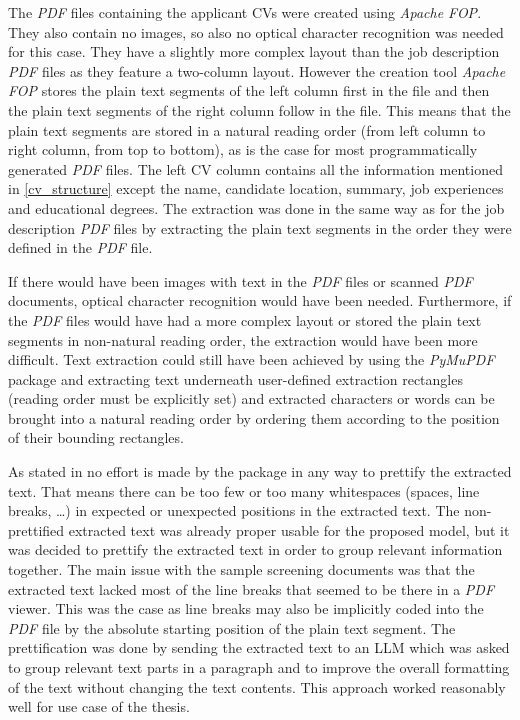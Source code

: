 \documentclass[draft,final]{thesisclass} %
\begin{document}
The \textit{PDF} files containing the applicant \acs{CV}s were created using \textit{Apache FOP}. They also contain no images, so also no optical character recognition was needed for this case.
They have a slightly more complex layout than the job description \textit{PDF} files as they feature a two-column layout.
However the creation tool \textit{Apache FOP} stores the plain text segments of the left column first in the  file and then the plain text segments of the right column follow in the file.
This means that the plain text segments are stored in a natural reading order (from left column to right column, from top to bottom), as is the case for most programmatically generated \textit{PDF} files.
The left \acs{CV} column contains all the information mentioned in \ref{cv_structure} except the name, candidate location, summary, job experiences and educational degrees.
The extraction was done in the same way as for the job description \textit{PDF} files by extracting the plain text segments in the order they were defined in the \textit{PDF} file.

If there would have been images with text in the \textit{PDF} files or scanned \textit{PDF} documents, optical character recognition would have been needed.
Furthermore, if the \textit{PDF} files would have had a more complex layout or stored the plain text segments in non-natural reading order, the extraction would have been more difficult.
Text extraction could still have been achieved by using the \textit{PyMuPDF} package and extracting text underneath user-defined extraction rectangles (reading order must be explicitly set) and extracted characters or words can be brought into a natural reading order by ordering them according to the position of their bounding rectangles.

As stated in \textcite{pymupdf} no effort is made by the package in any way to prettify the extracted text.
That means there can be too few or too many whitespaces (spaces, line breaks, \dots) in expected or unexpected positions in the extracted text.
The non-prettified extracted text was already proper usable for the proposed model, but it was decided to prettify the extracted text in order to group relevant information together.
The main issue with the sample screening documents was that the extracted text lacked most of the line breaks that seemed to be there in a \textit{PDF} viewer.
This was the case as line breaks may also be implicitly coded into the \textit{PDF} file by the absolute starting position of the plain text segment.
The prettification was done by sending the extracted text to an \acs{LLM} which was asked to group relevant text parts in a paragraph and to improve the overall formatting of the text without changing the text contents.
This approach worked reasonably well for use case of the thesis.
\end{document}
